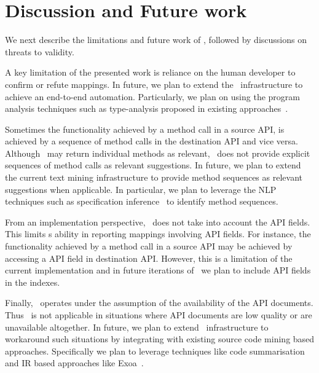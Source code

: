 \section{Discussion and Future work}
\label{sec:discussion}

We next describe the limitations and future work of \tool,
followed by discussions on threats to validity. 

A key limitation of the presented work is reliance on the human developer
to confirm or refute mappings.
In future, we plan to extend the \tool\ infrastructure to achieve an end-to-end automation. 
Particularly, we plan on using the program analysis techniques 
such as type-analysis proposed in
existing approaches~\cite{nguyen2014statistical,zhong09SE}.



Sometimes the functionality achieved by a method call in a source API,
is achieved by a sequence of method calls in the destination API and vice versa.
Although \tool\ may return individual methods as relevant, 
\tool\ does not provide explicit sequences of method calls as relevant suggestions.
In future, we plan to extend the current text mining infrastructure
to provide method sequences as relevant suggestions when applicable. 
In particular, we plan to leverage the NLP techniques such as
specification inference~\cite{pandita12:inferring} to identify method sequences. 



From an implementation perspective, \tool\ does not take into account 
the API fields.
This limits \tool s ability in reporting mappings involving API fields.
For instance, the functionality achieved by a  method call in a source API
may be achieved by accessing a API field in destination API.
However, this is a limitation of the current implementation 
and in future iterations of \tool\ we plan to include API fields in the indexes.

Finally, \tool\ operates under the assumption of the availability of the API documents.
Thus \tool\ is not applicable in situations where API documents are low quality or are unavailable altogether.
In future, we plan to extend \tool\ infrastructure to workaround such situations
by integrating with existing source code mining based approaches.
Specifically we plan to leverage techniques like code summarisation~\cite{sridhara2011ICPC} and IR based approaches like Exoa~\cite{kim2010towards}.



